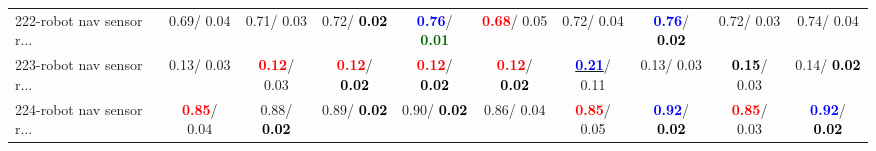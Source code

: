 \begin{table}[h]
\begin{center}
{\begin{tabular}{lc|c|c|c|c|c|c|c|c}
222-robot nav sensor r... &   0.69/  0.04 &   0.71/  0.03 &   0.72/\textcolor{black}{\textbf{  0.02}} & \textcolor{blue}{\textbf{  0.76}}/\textcolor{darkgreen}{\textbf{  0.01}} & \textcolor{red}{\textbf{  0.68}}/  0.05 &   0.72/  0.04 & \textcolor{blue}{\textbf{  0.76}}/\textcolor{black}{\textbf{  0.02}} &   0.72/  0.03 &   0.74/  0.04 \\
223-robot nav sensor r... &   0.13/  0.03 & \textcolor{red}{\textbf{  0.12}}/  0.03 & \textcolor{red}{\textbf{  0.12}}/\textcolor{black}{\textbf{  0.02}} & \textcolor{red}{\textbf{  0.12}}/\textcolor{black}{\textbf{  0.02}} & \textcolor{red}{\textbf{  0.12}}/\textcolor{black}{\textbf{  0.02}} & \underline{\textcolor{blue}{\textbf{  0.21}}}/  0.11 &   0.13/  0.03 & \textcolor{black}{\textbf{  0.15}}/  0.03 &   0.14/\textcolor{black}{\textbf{  0.02}} \\
224-robot nav sensor r... & \textcolor{red}{\textbf{  0.85}}/  0.04 &   0.88/\textcolor{black}{\textbf{  0.02}} &   0.89/\textcolor{black}{\textbf{  0.02}} &   0.90/\textcolor{black}{\textbf{  0.02}} &   0.86/  0.04 & \textcolor{red}{\textbf{  0.85}}/  0.05 & \textcolor{blue}{\textbf{  0.92}}/\textcolor{black}{\textbf{  0.02}} & \textcolor{red}{\textbf{  0.85}}/  0.03 & \textcolor{blue}{\textbf{  0.92}}/\textcolor{black}{\textbf{  0.02}} \\\end{tabular}}\label{stratsALCKappa6AllReduxhalfa}
\end{center}
\end{table}
